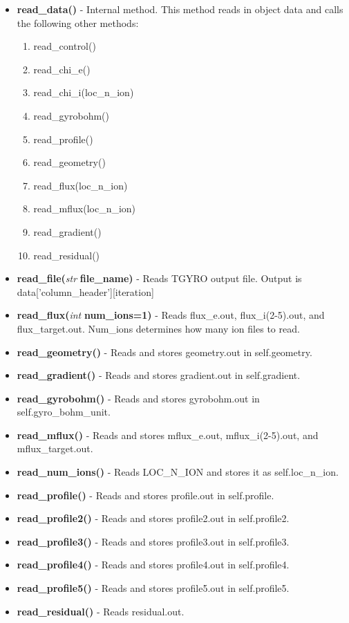 \documentclass{article}
\begin{document}
\begin{itemize}
\begin{itemize}
\item \textbf{read\_data()} - Internal method.  This method reads in object data and calls the following other methods:
\begin{enumerate}
\item read\_control()
\item read\_chi\_e()
\item read\_chi\_i(loc\_n\_ion)
\item read\_gyrobohm()
\item read\_profile()
\item read\_geometry()
\item read\_flux(loc\_n\_ion)
\item read\_mflux(loc\_n\_ion)
\item read\_gradient()
\item read\_residual()
\end{enumerate}
\item \textbf{read\_file(}\emph{str}\textbf{ file\_name)} - Reads TGYRO output file.  Output is data['column\_header'][iteration]
\item \textbf{read\_flux(}\emph{int}\textbf{ num\_ions=1)} - Reads flux\_e.out, flux\_i(2-5).out, and flux\_target.out.  Num\_ions determines how many ion files to read.
\item \textbf{read\_geometry()} - Reads and stores geometry.out in self.geometry.
\item \textbf{read\_gradient()} - Reads and stores gradient.out in self.gradient.
\item \textbf{read\_gyrobohm()} - Reads and stores gyrobohm.out in self.gyro\_bohm\_unit.
\item \textbf{read\_mflux()} - Reads and stores mflux\_e.out, mflux\_i(2-5).out, and mflux\_target.out.
\item \textbf{read\_num\_ions()} - Reads LOC\_N\_ION and stores it as self.loc\_n\_ion.
\item \textbf{read\_profile()} - Reads and stores profile.out in self.profile.
\item \textbf{read\_profile2()} - Reads and stores profile2.out in self.profile2.
\item \textbf{read\_profile3()} - Reads and stores profile3.out in self.profile3.
\item \textbf{read\_profile4()} - Reads and stores profile4.out in self.profile4.
\item \textbf{read\_profile5()} - Reads and stores profile5.out in self.profile5.
\item \textbf{read\_residual()} - Reads residual.out.

\end{itemize}
\end{itemize}
\end{document}
